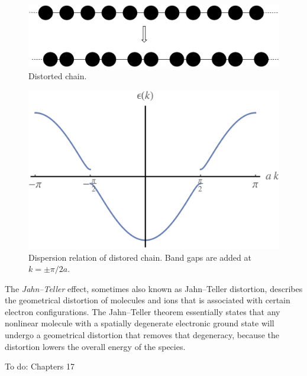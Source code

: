 \documentclass[10pt]{article}
\begin{document}
\begin{itemize}
\begin{figure}
  \centering
    \includegraphics[width=\textwidth]{p2}
    \caption{Distorted chain.}
\end{figure}

\begin{figure}
  \centering
    \includegraphics[width=\textwidth]{p3}
    \caption{Dispersion relation of distored chain. Band gaps are added at $k = \pm \pi/2a$.}
\end{figure}

\end{itemize}

The \emph{Jahn–Teller} effect, sometimes also known as Jahn–Teller distortion, describes the geometrical distortion of molecules and ions that is associated with certain electron configurations.
The Jahn–Teller theorem essentially states that any nonlinear molecule with a spatially degenerate electronic ground state will undergo a geometrical distortion that removes that degeneracy,
because the distortion lowers the overall energy of the species. 

To do: Chapters 17
\end{document}
